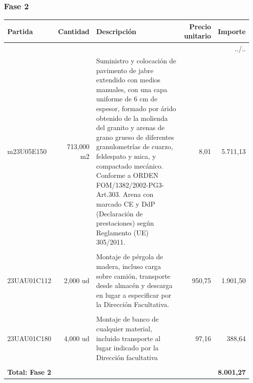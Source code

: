 \documentclass{book}%
\begin{document}
\subsubsection{Fase 2}%
\small%
\begin{longtable}{lrlrr}%
Partida&Cantidad&Descripción&\multicolumn{1}{p{1.5cm}}{Precio unitario}&Importe\\%
\hline%
\endhead%
\multicolumn{5}{r}{../..}\\%
\endfoot%
\hline%
\endlastfoot%
m23U05E150&   713,000 m2&\multicolumn{1}{p{5cm}}{Suministro y colocación de pavimento de jabre extendido con medios manuales, con una capa uniforme de 6 cm de espesor, formado por árido obtenido de la molienda del granito y arenas de grano grueso de diferentes granulometrías de cuarzo, feldespato y mica, y compactado mecánico. Conforme a ORDEN FOM/1382/2002{-}PG3{-}Art.303. Arena con marcado CE y DdP (Declaración de prestaciones) según Reglamento (UE) 305/2011.}&      8,01&5.711,13\\%
&&&&\\%
23UAU01C112&     2,000 ud&\multicolumn{1}{p{5cm}}{Montaje de pérgola de madera, incluso carga sobre camión, transporte desde almacén y descarga en lugar a especificar por la Dirección Facultativa.}&    950,75&1.901,50\\%
&&&&\\%
23UAU01C180&     4,000 ud&\multicolumn{1}{p{5cm}}{Montaje de banco de cualquier material, incluido transporte al lugar indicado por la Dirección facultativa}&     97,16&388,64\\%
&&&&\\%
\multicolumn{4}{p{8cm}}{\textbf{Total: Fase 2}}&\textbf{8.001,27}\\%
\end{longtable}%
\normalsize

%
\end{document}
